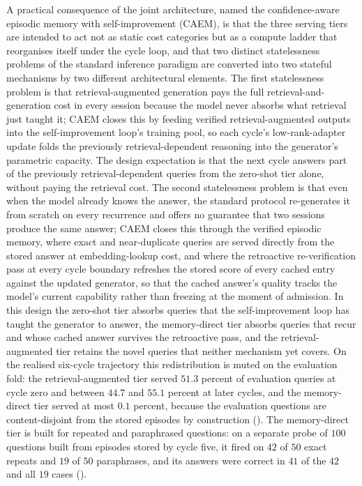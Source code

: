 A practical consequence of the joint architecture, named the confidence-aware episodic memory with self-improvement (CAEM), is that the three serving tiers are intended to act not as static cost categories but as a compute ladder that reorganises itself under the cycle loop, and that two distinct statelessness problems of the standard inference paradigm are converted into two stateful mechanisms by two different architectural elements. The first statelessness problem is that retrieval-augmented generation pays the full retrieval-and-generation cost in every session because the model never absorbs what retrieval just taught it; CAEM closes this by feeding verified retrieval-augmented outputs into the self-improvement loop's training pool, so each cycle's low-rank-adapter update folds the previously retrieval-dependent reasoning into the generator's parametric capacity. The design expectation is that the next cycle answers part of the previously retrieval-dependent queries from the zero-shot tier alone, without paying the retrieval cost. The second statelessness problem is that even when the model already knows the answer, the standard protocol re-generates it from scratch on every recurrence and offers no guarantee that two sessions produce the same answer; CAEM closes this through the verified episodic memory, where exact and near-duplicate queries are served directly from the stored answer at embedding-lookup cost, and where the retroactive re-verification pass at every cycle boundary refreshes the stored score of every cached entry against the updated generator, so that the cached answer's quality tracks the model's current capability rather than freezing at the moment of admission. In this design the zero-shot tier absorbs queries that the self-improvement loop has taught the generator to answer, the memory-direct tier absorbs queries that recur and whose cached answer survives the retroactive pass, and the retrieval-augmented tier retains the novel queries that neither mechanism yet covers. On the realised six-cycle trajectory this redistribution is muted on the evaluation fold: the retrieval-augmented tier served $51.3$ percent of evaluation queries at cycle zero and between $44.7$ and $55.1$ percent at later cycles, and the memory-direct tier served at most $0.1$ percent, because the evaluation questions are content-disjoint from the stored episodes by construction (). The memory-direct tier is built for repeated and paraphrased questions: on a separate probe of $100$ questions built from episodes stored by cycle five, it fired on $42$ of $50$ exact repeats and $19$ of $50$ paraphrases, and its answers were correct in $41$ of the $42$ and all $19$ cases ().

